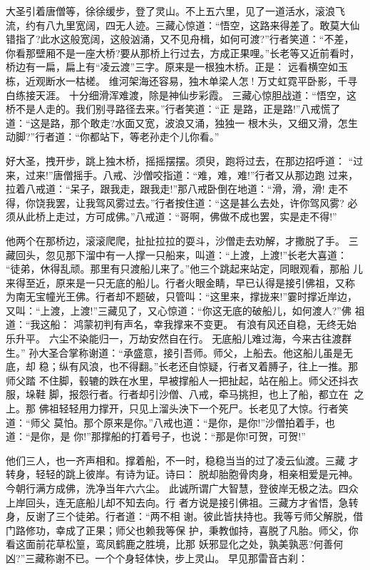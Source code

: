 大圣引着唐僧等，徐徐缓步，登了灵山。不上五六里，见了一道活水，滚浪飞
流，约有八九里宽阔，四无人迹。三藏心惊道：“悟空，这路来得差了。敢莫大仙
错指了?此水这般宽阔，这般汹涌，又不见舟楫，如何可渡?”行者笑道：“不差，
你看那壁厢不是一座大桥?要从那桥上行过去，方成正果哩。”长老等又近前看时，
桥边有一扁，扁上有“凌云渡”三字。原来是一根独木桥。正是：
远看横空如玉栋，近观断水一枯槎。
维河架海还容易，独木单梁人怎!
万丈虹霓平卧影，千寻白练接天涯。
十分细滑浑难渡，除是神仙步彩霞。
三藏心惊胆战道：“悟空，这桥不是人走的。我们别寻路径去来。”行者笑道：“正
是路，正是路!”八戒慌了道：“这是路，那个敢走?水面又宽，波浪又涌，独独一
根木头，又细又滑，怎生动脚?”行者道：“你都站下，等老孙走个儿你看。”

好大圣，拽开步，跳上独木桥，摇摇摆摆。须臾，跑将过去，在那边招呼道：
“过来，过来!”唐僧摇手。八戒、沙僧咬指道：“难，难，难!”行者又从那边跑
过来，拉着八戒道：“呆子，跟我走，跟我走!”那八戒卧倒在地道：“滑，滑，滑!
走不得，你饶我罢，让我驾风雾过去。”行者按住道：“这是甚么去处，许你驾风雾?
必须从此桥上走过，方可成佛。”八戒道：“哥啊，佛做不成也罢，实是走不得!”

他两个在那桥边，滚滚爬爬，扯扯拉拉的耍斗，沙僧走去劝解，才撒脱了手。
三藏回头，忽见那下溜中有一人撑一只船来，叫道：“上渡，上渡!”长老大喜道：
“徒弟，休得乱顽。那里有只渡船儿来了。”他三个跳起来站定，同眼观看，那船
儿来得至近，原来是一只无底的船儿。行者火眼金睛，早已认得是接引佛祖，又称
为南无宝幢光王佛。行者却不题破，只管叫：“这里来，撑拢来!”霎时撑近岸边，
又叫：“上渡，上渡!”三藏见了，又心惊道：“你这无底的破船儿，如何渡人?”佛
祖道：“我这船：
鸿蒙初判有声名，幸我撑来不变更。
有浪有风还自稳，无终无始乐升平。
六尘不染能归一，万劫安然自在行。
无底船儿难过海，今来古往渡群生。”
孙大圣合掌称谢道：“承盛意，接引吾师。师父，上船去。他这船儿虽是无底，却
稳；纵有风浪，也不得翻。”长老还自惊疑，行者叉着膊子，往上一推。那师父踏
不住脚，毂辘的跌在水里，早被撑船人一把扯起，站在船上。师父还抖衣服，垛鞋
脚，报怨行者。行者却引沙僧、八戒，牵马挑担，也上了船，都立在之上。那
佛祖轻轻用力撑开，只见上溜头泱下一个死尸。长老见了大惊。行者笑道：“师父
莫怕。那个原来是你。”八戒也道：“是你，是你!”沙僧拍着手，也道：“是你，是
你!”那撑船的打着号子，也说：“那是你!可贺，可贺!”

他们三人，也一齐声相和。撑着船，不一时，稳稳当当的过了凌云仙渡。三藏
才转身，轻轻的跳上彼岸。有诗为证。诗曰：
脱却胎胞骨肉身，相亲相爱是元神。
今朝行满方成佛，洗净当年六六尘。
此诚所谓广大智慧，登彼岸无极之法。四众上岸回头，连无底船儿却不知去向。行
者方说是接引佛祖。三藏方才省悟，急转身，反谢了三个徒弟。行者道：“两不相
谢。彼此皆扶持也。我等亏师父解脱，借门路修功，幸成了正果；师父也赖我等保
护，秉教伽持，喜脱了凡胎。师父，你看这面前花草松篁，鸾凤鹤鹿之胜境，比那
妖邪显化之处，孰美孰恶?何善何凶?”三藏称谢不已。一个个身轻体快，步上灵山。
早见那雷音古刹：

